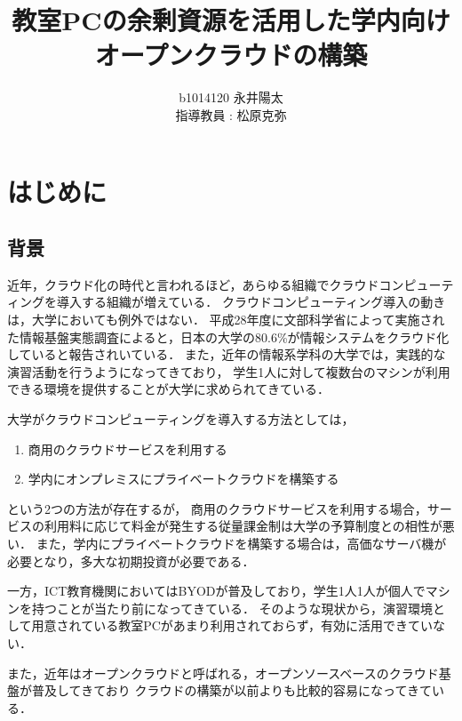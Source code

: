 \documentclass[11pt,a4paper]{jsarticle}
\author{%
b1014120 永井陽太\\指導教員 : 松原克弥
}
\title{教室PCの余剰資源を活用した学内向けオープンクラウドの構築}
\begin{document}
\maketitle

\section{はじめに}
\subsection{背景}
近年，クラウド化の時代と言われるほど，あらゆる組織でクラウドコンピューティングを導入する組織が増えている\cite{academiccloud}．
クラウドコンピューティング導入の動きは，大学においても例外ではない．
平成28年度に文部科学省によって実施された情報基盤実態調査によると，日本の大学の80.6\%が情報システムをクラウド化していると報告されいている\cite{SurveyOnActualStateOfAcademicInformationInfrastructure}．
また，近年の情報系学科の大学では，実践的な演習活動を行うようになってきており\cite{practicalict}，
学生1人に対して複数台のマシンが利用できる環境を提供することが大学に求められてきている．
\par 大学がクラウドコンピューティングを導入する方法としては，
\begin{enumerate}
	\item 商用のクラウドサービスを利用する
	\item 学内にオンプレミスにプライベートクラウドを構築する
\end{enumerate}
という2つの方法が存在するが，
商用のクラウドサービスを利用する場合，サービスの利用料に応じて料金が発生する従量課金制は大学の予算制度との相性が悪い．
また，学内にプライベートクラウドを構築する場合は，高価なサーバ機が必要となり，多大な初期投資が必要である．
\par 一方，ICT教育機関においてはBYODが普及しており，学生1人1人が個人でマシンを持つことが当たり前になってきている．
そのような現状から，演習環境として用意されている教室PCがあまり利用されておらず，有効に活用できていない．
\par また，近年はオープンクラウドと呼ばれる，オープンソースベースのクラウド基盤が普及してきており
クラウドの構築が以前よりも比較的容易になってきている．
\end{document}
